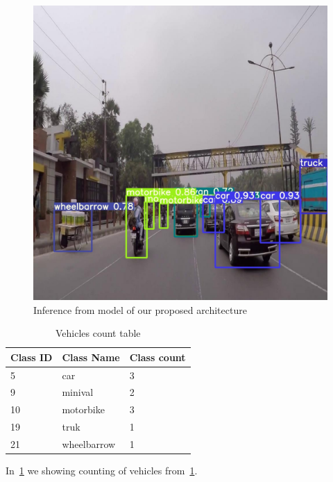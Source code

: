 \begin{figure}[h]
    \centering
    \includegraphics[max width=\textwidth]{images/ours/Asraf_51_jpg.rf.0e3516baf7509bc2c4a4aa8deea494c2.jpg}
   \caption[Inference sample]{ Inference from model of our proposed architecture}
    \label{fig:inference23}
\end{figure}

\begin{table}[!h]
  \centering
  \caption[Vehicles count]{ Vehicles count table}
  \label{tab:vehicle_count}
  {\renewcommand{\arraystretch}{1.1}
    \begin{tabular}{p{2cm} p{3cm} p{3cm}}
          \toprule
            Class ID & Class Name & Class count \\
          \hline
            5 & car & 3 \\
            9 & minival & 2 \\
            10 & motorbike & 3 \\
            19 & truk & 1 \\
            21 & wheelbarrow & 1 \\
          \bottomrule
    \end{tabular}
  }
\end{table}

In~\ref{tab:vehicle_count} we showing counting of vehicles from~\ref{fig:inference23}.



